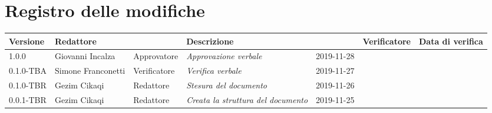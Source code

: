 \section*{Registro delle modifiche}
\renewcommand{\arraystretch}{1.8}

\begin{longtable}{|p{1.5cm}|p{1.7cm}|p{2cm}|p{2cm}|p{1.7cm}|p{2cm}|p{2.7cm}|}
  \hline
  \rowcolor{header}
  \textbf{Versione} & \textbf{Redattore} & \centering{\textbf{Ruolo}} & \textbf{Descrizione} &      \centering{\textbf{Data}} & \textbf{Verificatore} & \textbf{Data di verifica} \\
    \hline

    1.0.0 & Giovanni Incalza & Approvatore & \small{\textit{Approvazione verbale}} & 2019-11-28 & & \\
    0.1.0-TBA & Simone Franconetti & Verificatore & \small{\textit{Verifica verbale}} & 2019-11-27 & & \\
    0.1.0-TBR & Gezim Cikaqi & Redattore & \small{\textit{Stesura del documento}} & 2019-11-26 & & \\
    0.0.1-TBR & Gezim Cikaqi & Redattore & \small{\textit{Creata la struttura del documento}} & 2019-11-25 & & \\

    \hline
  \end{longtable}
